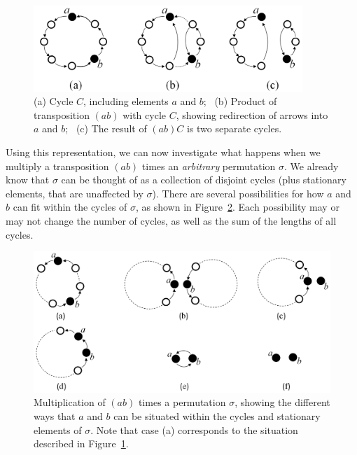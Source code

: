 \begin{figure}[ht]
\begin{center}
\includegraphics[width=4in]{images/abC.png}
\caption{(a) Cycle $C$, including elements $a$ and $b$;~ (b) Product of transposition $(ab)$ with cycle $C$, showing redirection of arrows into $a$ and $b$;~ (c) The result of $(ab)C$ is two separate cycles.}\label{fig:abC}
\end{center}
\end{figure}

Using this representation, we can now investigate what happens when we multiply a transposition $(ab)$ times an \emph{arbitrary} permutation  $\sigma$. We already know that $\sigma$ can be thought of as a collection of disjoint cycles (plus stationary  elements, that are unaffected by $\sigma$). There are several possibilities for how $a$ and $b$ can fit within the cycles of $\sigma$, as shown in Figure~\ref{fig:abC2}.  Each possibility may or may not change the number of cycles, as well as the sum of the lengths of all cycles.   

\begin{figure}[!h]
\begin{center}
\includegraphics[width=5in]{images/abC2.png}
\caption{Multiplication of $(ab)$ times a permutation $\sigma$, showing the different ways that $a$ and $b$ can be situated within the cycles and stationary elements of  $\sigma$. Note that  case (a) corresponds to the situation described in Figure~\ref{fig:abC}. }\label{fig:abC2}
\end{center}
\end{figure}

